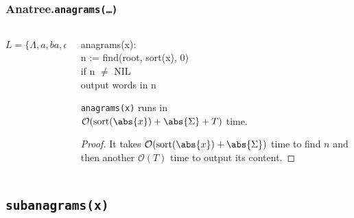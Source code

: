 \documentclass[english, aspectratio=169]{beamer}
\newcommand{\sort}[1]{\text{sort}(#1)}
\newcommand{\Oh}[1]{\ensuremath{\mathcal{O}(#1)}}
\begin{document}
\begin{frame}[fragile]
  \frametitle{Anatree.\texttt{anagrams(\dots)}}

  \begin{columns}
    \begin{column}{0.55\textwidth}
      \centering

      \begin{tikzpicture}
        
      \end{tikzpicture}

      $L = \{ \Lambda, a, ba, ca, aba, baa \}$
    \end{column}
    \begin{column}{0.45\textwidth}
      \small\tt

      anagrams(x):\\
      \quad n  := find(root, sort(x), 0)\\
      \quad if n $\neq$ NIL\\
      \qquad output words in n

      \vspace{10pt}

      \begin{corollary}
        \texttt{anagrams(x)} runs in\\$\Oh{\sort{\abs{x}} + \abs{\Sigma} + T}$ time.
      \end{corollary}
      \begin{proof}
        It takes $\Oh{\sort{\abs{x}} + \abs{\Sigma}}$ time to find
        $n$ and then another $\Oh{T}$ time to output its content.
      \end{proof}
    \end{column}
  \end{columns}
\end{frame}

\subsection{\texttt{subanagrams(x)}}
\end{document}
